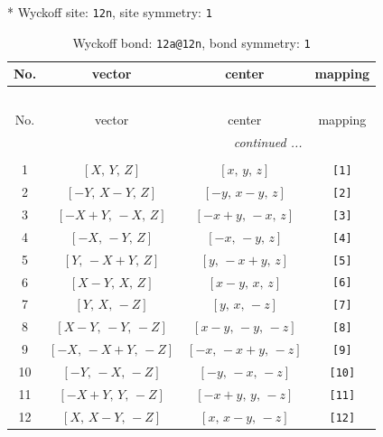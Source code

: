 \documentclass[fleqn,8pt]{jsarticle}
\begin{document}
* Wyckoff site: {\tt 12n}, site symmetry: {\tt 1}
\renewcommand{\arraystretch}{1.2}
\begin{longtable}{cccc}
\caption{Wyckoff bond: {\tt 12a@12n}, bond symmetry: {\tt 1}}
 \\
 \hline \hline
No. & vector & center & mapping \\ \hline \endfirsthead

\multicolumn{3}{l}{\tablename\ \thetable{}} \\
 \hline \hline
No. & vector & center & mapping \\ \hline \endhead

 \hline \hline
\multicolumn{3}{r}{\footnotesize\it continued ...} \\ \endfoot

 \hline \hline
\multicolumn{3}{r}{} \\ \endlastfoot

1 & $\left[ X,\, Y,\, Z \right]$ & $\left[ x,\, y,\, z \right]$ & {\tt [1]} \\ \hline
2 & $\left[ - Y,\, X - Y,\, Z \right]$ & $\left[ - y,\, x - y,\, z \right]$ & {\tt [2]} \\ \hline
3 & $\left[ - X + Y,\, - X,\, Z \right]$ & $\left[ - x + y,\, - x,\, z \right]$ & {\tt [3]} \\ \hline
4 & $\left[ - X,\, - Y,\, Z \right]$ & $\left[ - x,\, - y,\, z \right]$ & {\tt [4]} \\ \hline
5 & $\left[ Y,\, - X + Y,\, Z \right]$ & $\left[ y,\, - x + y,\, z \right]$ & {\tt [5]} \\ \hline
6 & $\left[ X - Y,\, X,\, Z \right]$ & $\left[ x - y,\, x,\, z \right]$ & {\tt [6]} \\ \hline
7 & $\left[ Y,\, X,\, - Z \right]$ & $\left[ y,\, x,\, - z \right]$ & {\tt [7]} \\ \hline
8 & $\left[ X - Y,\, - Y,\, - Z \right]$ & $\left[ x - y,\, - y,\, - z \right]$ & {\tt [8]} \\ \hline
9 & $\left[ - X,\, - X + Y,\, - Z \right]$ & $\left[ - x,\, - x + y,\, - z \right]$ & {\tt [9]} \\ \hline
10 & $\left[ - Y,\, - X,\, - Z \right]$ & $\left[ - y,\, - x,\, - z \right]$ & {\tt [10]} \\ \hline
11 & $\left[ - X + Y,\, Y,\, - Z \right]$ & $\left[ - x + y,\, y,\, - z \right]$ & {\tt [11]} \\ \hline
12 & $\left[ X,\, X - Y,\, - Z \right]$ & $\left[ x,\, x - y,\, - z \right]$ & {\tt [12]} \\
\end{longtable}
\end{document}
